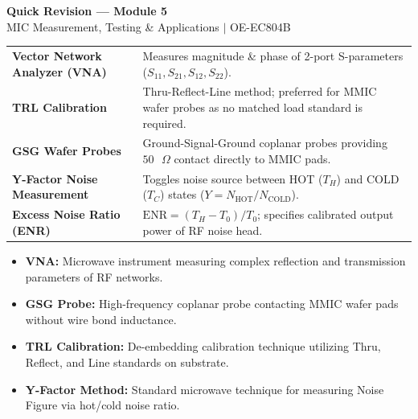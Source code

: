 \documentclass[12pt,a4paper]{article}
\renewcommand{\arraystretch}{1.45}
\begin{document}
\newpage
\begin{center}
  {\large\bfseries\color{myred} Quick Revision --- Module 5}\\[3pt]
  {\small\color{mydark} MIC Measurement, Testing \& Applications $|$ OE-EC804B}
\end{center}
\noindent{\color{myred}\rule{\linewidth}{1.2pt}}
\vspace{4pt}

\begin{tcolorbox}[formulabox, title={\textbf{Key Concepts and Metrics at a Glance}}]
\renewcommand{\arraystretch}{1.35}
\begin{tabularx}{\linewidth}{>{\raggedright\arraybackslash\bfseries}p{4.5cm} X}
Vector Network Analyzer (VNA) & Measures magnitude \& phase of 2-port S-parameters ($S_{11}, S_{21}, S_{12}, S_{22}$). \\[4pt]
TRL Calibration & Thru-Reflect-Line method; preferred for MMIC wafer probes as no matched load standard is required. \\[4pt]
GSG Wafer Probes & Ground-Signal-Ground coplanar probes providing $50\text{ }\Omega$ contact directly to MMIC pads. \\[4pt]
Y-Factor Noise Measurement & Toggles noise source between HOT ($T_H$) and COLD ($T_C$) states ($Y = N_{\text{HOT}}/N_{\text{COLD}}$). \\[4pt]
Excess Noise Ratio (ENR) & $\text{ENR} = (T_H - T_0)/T_0$; specifies calibrated output power of RF noise head. \\
\end{tabularx}
\end{tcolorbox}

\begin{tcolorbox}[defbox, title={\textbf{One-Line Definitions}}]
  \begin{itemize}[leftmargin=*, noitemsep]
    \item \textbf{VNA:} Microwave instrument measuring complex reflection and transmission parameters of RF networks.
    \item \textbf{GSG Probe:} High-frequency coplanar probe contacting MMIC wafer pads without wire bond inductance.
    \item \textbf{TRL Calibration:} De-embedding calibration technique utilizing Thru, Reflect, and Line standards on substrate.
    \item \textbf{Y-Factor Method:} Standard microwave technique for measuring Noise Figure via hot/cold noise ratio.
  \end{itemize}
\end{tcolorbox}
\end{document}
